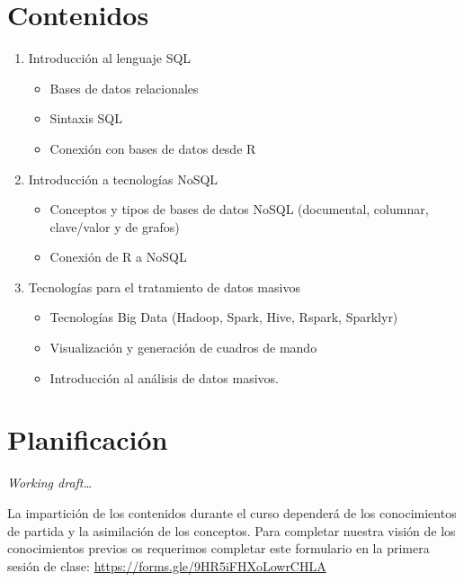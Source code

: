 \documentclass[]{book}
\providecommand{\tightlist}{%
  \setlength{\itemsep}{0pt}\setlength{\parskip}{0pt}}
\begin{document}
\section{Contenidos}\label{contenidos}

\begin{enumerate}
\def\labelenumi{\arabic{enumi}.}
\tightlist
\item
  Introducción al lenguaje SQL

  \begin{itemize}
  \tightlist
  \item
    Bases de datos relacionales
  \item
    Sintaxis SQL
  \item
    Conexión con bases de datos desde R
  \end{itemize}
\item
  Introducción a tecnologías NoSQL

  \begin{itemize}
  \tightlist
  \item
    Conceptos y tipos de bases de datos NoSQL (documental, columnar,
    clave/valor y de grafos)
  \item
    Conexión de R a NoSQL
  \end{itemize}
\item
  Tecnologías para el tratamiento de datos masivos

  \begin{itemize}
  \tightlist
  \item
    Tecnologías Big Data (Hadoop, Spark, Hive, Rspark, Sparklyr)
  \item
    Visualización y generación de cuadros de mando
  \item
    Introducción al análisis de datos masivos.
  \end{itemize}
\end{enumerate}

\section{Planificación}\label{planificacion}

\emph{Working draft\ldots{}}

La impartición de los contenidos durante el curso dependerá de los
conocimientos de partida y la asimilación de los conceptos. Para
completar nuestra visión de los conocimientos previos os requerimos
completar este formulario en la primera sesión de clase:
\url{https://forms.gle/9HR5iFHXoLowrCHLA}
\end{document}

